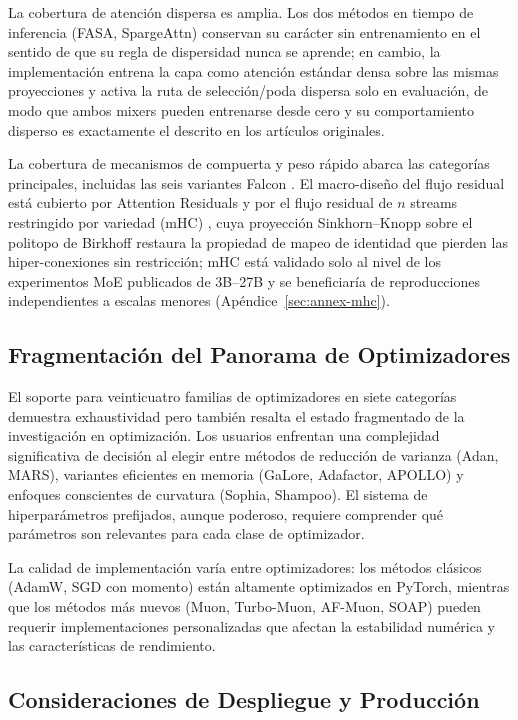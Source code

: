 La cobertura de atención dispersa es amplia. Los dos métodos en tiempo de inferencia (FASA, SpargeAttn) conservan su carácter sin entrenamiento en el sentido de que su regla de dispersidad nunca se aprende; en cambio, la implementación entrena la capa como atención estándar densa sobre las mismas proyecciones y activa la ruta de selección/poda dispersa solo en evaluación, de modo que ambos mixers pueden entrenarse desde cero y su comportamiento disperso es exactamente el descrito en los artículos originales.

La cobertura de mecanismos de compuerta y peso rápido abarca las categorías principales, incluidas las seis variantes Falcon \citep{zhang_falcon_2026}. El macro-diseño del flujo residual está cubierto por Attention Residuals \citep{sun_attnres_2026} y por el flujo residual de $n$ streams restringido por variedad (mHC) \citep{xie_mhc_2025}, cuya proyección Sinkhorn--Knopp sobre el politopo de Birkhoff restaura la propiedad de mapeo de identidad que pierden las hiper-conexiones sin restricción; mHC está validado solo al nivel de los experimentos MoE publicados de 3B--27B y se beneficiaría de reproducciones independientes a escalas menores (Apéndice~\ref{sec:annex-mhc}).

\subsection{Fragmentación del Panorama de Optimizadores}

El soporte para veinticuatro familias de optimizadores en siete categorías demuestra exhaustividad pero también resalta el estado fragmentado de la investigación en optimización. Los usuarios enfrentan una complejidad significativa de decisión al elegir entre métodos de reducción de varianza (Adan, MARS), variantes eficientes en memoria (GaLore, Adafactor, APOLLO) y enfoques conscientes de curvatura (Sophia, Shampoo). El sistema de hiperparámetros prefijados, aunque poderoso, requiere comprender qué parámetros son relevantes para cada clase de optimizador.

La calidad de implementación varía entre optimizadores: los métodos clásicos (AdamW, SGD con momento) están altamente optimizados en PyTorch, mientras que los métodos más nuevos (Muon, Turbo-Muon, AF-Muon, SOAP) pueden requerir implementaciones personalizadas que afectan la estabilidad numérica y las características de rendimiento.

\subsection{Consideraciones de Despliegue y Producción}

